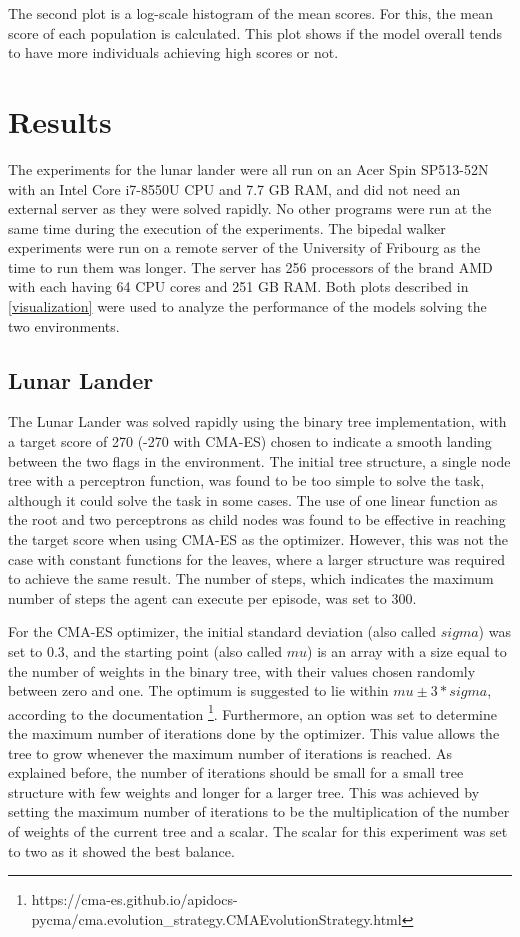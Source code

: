 The second plot is a log-scale histogram of the mean scores. For this, the mean score of each population is calculated. This plot shows if the model overall tends to have more individuals achieving high scores or not.

\section{Results}
The experiments for the lunar lander were all run on an Acer Spin SP513-52N with an Intel Core i7-8550U CPU and 7.7 GB RAM, and did not need an external server as they were solved rapidly. No other programs were run at the same time during the execution of the experiments. The bipedal walker experiments were run on a remote server of the University of Fribourg as the time to run them was longer. The server has 256 processors of the brand AMD with each having 64 CPU cores and 251 GB RAM. Both plots described in \ref{visualization} were used to analyze the performance of the models solving the two environments.

\subsection{Lunar Lander}
\label{lunar_lander}
The Lunar Lander was solved rapidly using the binary tree implementation, with a target score of 270 (-270 with CMA-ES) chosen to indicate a smooth landing between the two flags in the environment. The initial tree structure, a single node tree with a perceptron function, was found to be too simple to solve the task, although it could solve the task in some cases. The use of one linear function as the root and two perceptrons as child nodes was found to be effective in reaching the target score when using CMA-ES as the optimizer. However, this was not the case with constant functions for the leaves, where a larger structure was required to achieve the same result. The number of steps, which indicates the maximum number of steps the agent can execute per episode, was set to 300.

For the CMA-ES optimizer, the initial standard deviation (also called $sigma$) was set to 0.3, and the starting point (also called $mu$) is an array with a size equal to the number of weights in the binary tree, with their values chosen randomly between zero and one. The optimum is suggested to lie within $mu \pm 3*sigma$, according to the documentation \footnote{https://cma-es.github.io/apidocs-pycma/cma.evolution\_strategy.CMAEvolutionStrategy.html}. Furthermore, an option was set to determine the maximum number of iterations done by the optimizer. This value allows the tree to grow whenever the maximum number of iterations is reached. As explained before, the number of iterations should be small for a small tree structure with few weights and longer for a larger tree. This was achieved by setting the maximum number of iterations to be the multiplication of the number of weights of the current tree and a scalar. The scalar for this experiment was set to two as it showed the best balance.


